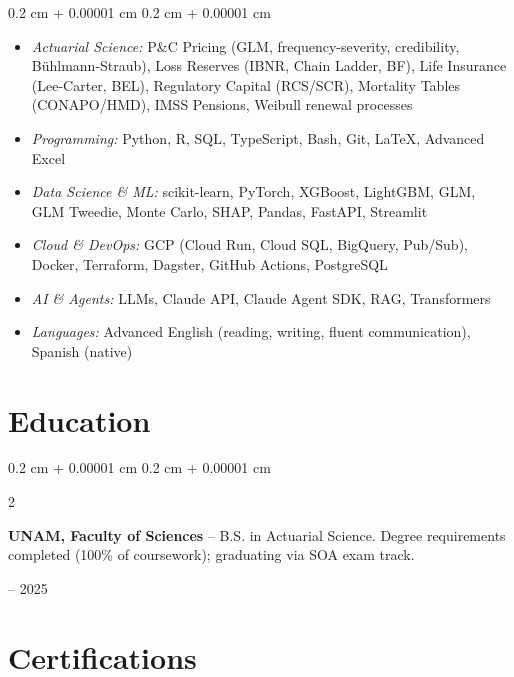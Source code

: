 \documentclass[10pt, letterpaper]{article}
\newenvironment{highlightsforbulletentries}{
    \begin{itemize}[
        topsep=0 cm,parsep=0.02 cm,
        partopsep=0pt,
        itemsep=0pt,
        leftmargin=10pt
    ]
}{
    \end{itemize}
}
\newenvironment{onecolentry}{
    \begin{adjustwidth}{
        0.2 cm + 0.00001 cm
    }{
        0.2 cm + 0.00001 cm
    }
}{
    \end{adjustwidth}
}
\newenvironment{twocolentry}[2][]{
    \onecolentry
    \def\secondColumn{#2}
    \setcolumnwidth{\fill, 4.0 cm}
    \begin{paracol}{2}
}{
    \switchcolumn \raggedleft \secondColumn
    \end{paracol}
    \endonecolentry
}
\begin{document}
\begin{onecolentry}
    \begin{highlightsforbulletentries}
        \item \textit{Actuarial Science:} P\&C Pricing (GLM, frequency-severity, credibility, Bühlmann-Straub), Loss Reserves (IBNR, Chain Ladder, BF), Life Insurance (Lee-Carter, BEL), Regulatory Capital (RCS/SCR), Mortality Tables (CONAPO/HMD), IMSS Pensions, Weibull renewal processes
        \item \textit{Programming:} Python, R, SQL, TypeScript, Bash, Git, \LaTeX, Advanced Excel
        \item \textit{Data Science \& ML:} scikit-learn, PyTorch, XGBoost, LightGBM, GLM, GLM Tweedie, Monte Carlo, SHAP, Pandas, FastAPI, Streamlit
        \item \textit{Cloud \& DevOps:} GCP (Cloud Run, Cloud SQL, BigQuery, Pub/Sub), Docker, Terraform, Dagster, GitHub Actions, PostgreSQL
        \item \textit{AI \& Agents:} LLMs, Claude API, Claude Agent SDK, RAG, Transformers
        \item \textit{Languages:} Advanced English (reading, writing, fluent communication), Spanish (native)
    \end{highlightsforbulletentries}
\end{onecolentry}


    \section{Education}

        \begin{twocolentry}{2021 -- 2025}
            \textbf{UNAM, Faculty of Sciences} -- B.S. in Actuarial Science. Degree requirements completed (100\% of coursework); graduating via SOA exam track.
        \end{twocolentry}

    \section{Certifications}
\end{document}
